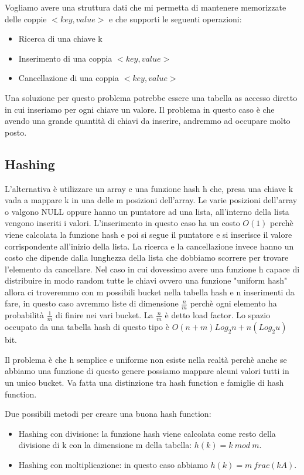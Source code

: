 \documentclass[14pt]{extreport}
\begin{document}
Vogliamo avere una struttura dati che mi permetta di mantenere memorizzate delle coppie $<key, value>$ e che supporti le seguenti operazioni:
\begin{itemize}
\item Ricerca di una chiave k
\item Inserimento di una coppia $<key, value>$
\item Cancellazione di una coppia $<key, value>$
\end{itemize}

Una soluzione per questo problema potrebbe essere una tabella as accesso diretto in cui inseriamo per ogni chiave un valore. Il problema in questo caso è che avendo una grande quantità di chiavi da inserire, andremmo ad occupare molto posto.

\subsection{Hashing}

L'alternativa è utilizzare un array e una funzione hash h che, presa una chiave k vada a mappare k in una delle m posizioni dell'array.
Le varie posizioni dell'array o valgono NULL oppure hanno un puntatore ad una lista, all'interno della lista vengono inseriti i valori.
L'inserimento in questo caso ha un costo $O(1)$ perchè viene calcolata la funzione hash e poi si segue il puntatore e si inserisce il valore corrispondente all'inizio della lista.
La ricerca e la cancellazione invece hanno un costo che dipende dalla lunghezza della lista che dobbiamo scorrere per trovare l'elemento da cancellare.
Nel caso in cui dovessimo avere una funzione h capace di distribuire in modo random tutte le chiavi ovvero una funzione "uniform hash" allora ci troveremmo con m possibili bucket nella tabella hash e n inserimenti da fare, in questo caso avremmo liste di dimensione $\frac{n}{m}$ perchè ogni elemento ha probabilità $\frac{1}{m}$ di finire nei vari bucket. La $\frac{n}{m}$ è detto load factor.
Lo spazio occupato da una tabella hash di questo tipo è $O(n+m)Log_2n + n(Log_2 u)$ bit.

Il problema è che h semplice e uniforme non esiste nella realtà perchè anche se abbiamo una funzione di questo genere possiamo mappare alcuni valori tutti in un unico bucket. Va fatta una distinzione tra hash function e famiglie di hash function.

Due possibili metodi per creare una buona hash function:
\begin{itemize}
\item Hashing con divisione: la funzione hash viene calcolata come resto della divisione di k con la dimensione m della tabella: $h(k)=k\ mod\ m$.
\item Hashing con moltiplicazione: in questo caso abbiamo $h(k)=m\ frac(kA)$.
\end{itemize}
\end{document}
